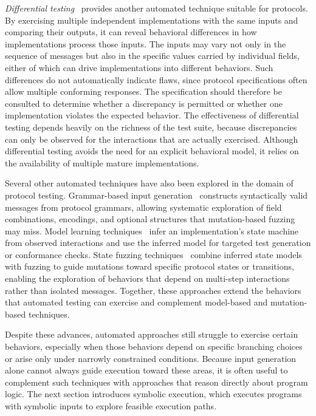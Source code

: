 \emph{Differential testing}~\cite{McKeeman@DiffTesting, RFCcert@ICSE-18, SymCerts, PKCS} provides another automated technique suitable for protocols. 
By exercising multiple independent implementations with the same inputs and comparing their outputs, it can reveal behavioral differences in how implementations process those inputs. 
The inputs may vary not only in the sequence of messages but also in the specific values carried by individual fields, either of which can drive implementations into different behaviors. 
Such differences do not automatically indicate flaws, since protocol specifications often allow multiple conforming responses. 
The specification should therefore be consulted to determine whether a discrepancy is permitted or whether one implementation violates the expected behavior. 
The effectiveness of differential testing depends heavily on the richness of the test suite, because discrepancies can only be observed for the interactions that are actually exercised. 
Although differential testing avoids the need for an explicit behavioral model, it relies on the availability of multiple mature implementations.

Several other automated techniques have also been explored in the domain of protocol testing.
Grammar-based input generation~\cite{Peach@2004, SPIKE@2002} constructs syntactically valid messages from protocol grammars, allowing systematic exploration of field combinations, encodings, and optional structures that mutation-based fuzzing may miss.
Model learning techniques~\cite{FH2017, FJV2016, SSH@SPIN-2017} infer an implementation's state machine from observed interactions and use the inferred model for targeted test generation or conformance checks.
State fuzzing techniques~\cite{MessyTLS@CACM-2017, ruiter2015, DTLS@USENIX-20, DTLS-Fuzzer@ICST-22} combine inferred state models with fuzzing to guide mutations toward specific protocol states or transitions, enabling the exploration of behaviors that depend on multi-step interactions rather than isolated messages. 
Together, these approaches extend the behaviors that automated testing can exercise and complement model-based and mutation-based techniques.

Despite these advances, automated approaches still struggle to exercise certain behaviors, especially when those behaviors depend on specific branching choices or arise only under narrowly constrained conditions.
Because input generation alone cannot always guide execution toward these areas, it is often useful to complement such techniques with approaches that reason directly about program logic.
The next section introduces symbolic execution, which executes programs with symbolic inputs to explore feasible execution paths.

